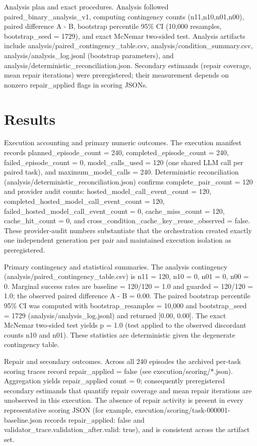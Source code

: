 \documentclass[conference]{IEEEtran}
\begin{document}
Analysis plan and exact procedures. Analysis followed paired\_binary\_analysis\_v1, computing contingency counts (n11,n10,n01,n00), paired difference A - B, bootstrap percentile 95\% CI (10,000 resamples, bootstrap\_seed = 1729), and exact McNemar two‑sided test. Analysis artifacts include analysis/paired\_contingency\_table.csv, analysis/condition\_summary.csv, analysis/analysis\_log.jsonl (bootstrap parameters), and analysis/deterministic\_reconciliation.json. Secondary estimands (repair coverage, mean repair iterations) were preregistered; their measurement depends on nonzero repair\_applied flags in scoring JSONs.

\section{Results}
Execution accounting and primary numeric outcomes. The execution manifest records planned\_episode\_count = 240, completed\_episode\_count = 240, failed\_episode\_count = 0, model\_calls\_used = 120 (one shared LLM call per paired task), and maximum\_model\_calls = 240. Deterministic reconciliation (analysis/deterministic\_reconciliation.json) confirms complete\_pair\_count = 120 and provider audit counts: hosted\_model\_call\_event\_count = 120, completed\_hosted\_model\_call\_event\_count = 120, failed\_hosted\_model\_call\_event\_count = 0, cache\_miss\_count = 120, cache\_hit\_count = 0, and cross\_condition\_cache\_key\_reuse\_observed = false. These provider‑audit numbers substantiate that the orchestration created exactly one independent generation per pair and maintained execution isolation as preregistered.

Primary contingency and statistical summaries. The analysis contingency (analysis/paired\_contingency\_table.csv) is n11 = 120, n10 = 0, n01 = 0, n00 = 0. Marginal success rates are baseline = 120/120 = 1.0 and guarded = 120/120 = 1.0; the observed paired difference A - B = 0.00. The paired bootstrap percentile 95\% CI was computed with bootstrap\_resamples = 10,000 and bootstrap\_seed = 1729 (analysis/analysis\_log.jsonl) and returned [0.00, 0.00]. The exact McNemar two‑sided test yields p = 1.0 (test applied to the observed discordant counts n10 and n01). These statistics are deterministic given the degenerate contingency table.

Repair and secondary outcomes. Across all 240 episodes the archived per‑task scoring traces record repair\_applied = false (see execution/scoring/*.json). Aggregation yields repair\_applied count = 0; consequently preregistered secondary estimands that quantify repair coverage and mean repair iterations are unobserved in this execution. The absence of repair activity is present in every representative scoring JSON (for example, execution/scoring/task-000001-baseline.json records repair\_applied: false and validator\_trace.validation\_after.valid: true), and is consistent across the artifact set.
\end{document}
